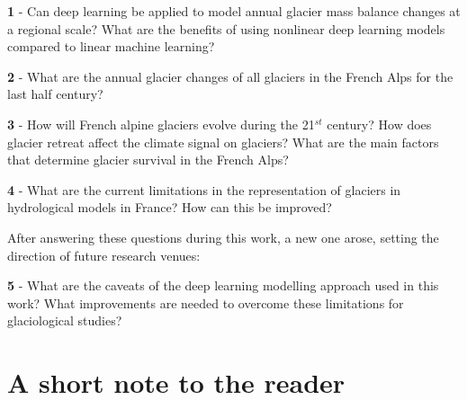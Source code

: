 \begin{list}{\textbf{Question}}{}

\item \textbf{1} - Can deep learning be applied to model annual glacier mass balance changes at a regional scale? What are the benefits of using nonlinear deep learning models compared to linear machine learning?

\item \textbf{2}  - What are the annual glacier changes of all glaciers in the French Alps for the last half century? 

\item \textbf{3} - How will French alpine glaciers evolve during the 21$^{st}$ century? How does glacier retreat affect the climate signal on glaciers? What are the main factors that determine glacier survival in the French Alps?

\item \textbf{4} - What are the current limitations in the representation of glaciers in hydrological models in France? How can this be improved?

\end{list}

After answering these questions during this work, a new one arose, setting the direction of future research venues:

\begin{list}{\textbf{Question}}{}

\item \textbf{5} - What are the caveats of the deep learning modelling approach used in this work? What improvements are needed to overcome these limitations for glaciological studies?

\end{list}

\section*{A short note to the reader}

